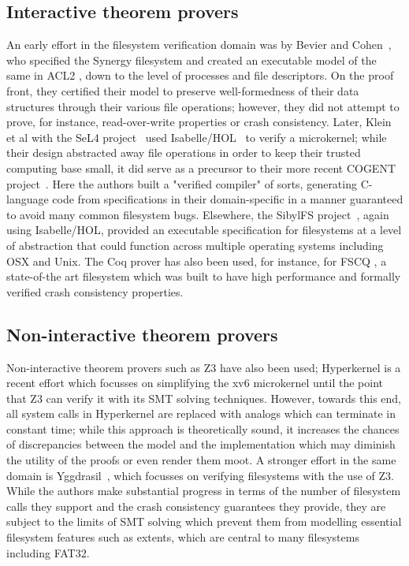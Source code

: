 \documentclass[runningheads,a4paper]{llncs}
\begin{document}
\subsection{Interactive theorem provers}
An early effort in the filesystem verification domain was by Bevier
and Cohen~\cite{bevier1996executable}, who specified the Synergy
filesystem and created an executable model of the same in ACL2
\cite{kaufmann_manolios_moore_2000}, down to the level of processes
and file descriptors. On the proof front, they certified their model
to preserve well-formedness of their data structures through their
various file operations; however, they did not attempt to prove, for
instance, read-over-write properties or crash consistency. Later,
Klein et al with the SeL4 project~\cite{klein2009sel4} used
Isabelle/HOL~\cite{nipkow2002isabelle} to verify a microkernel;
while their design abstracted away file operations in order to keep
their trusted computing base small, it did serve as a precursor to their
more recent COGENT project~\cite{amani2016cogent}. Here the authors
built a "verified compiler" of sorts, generating C-language code from
specifications in their domain-specific in a manner guaranteed to
avoid many common filesystem bugs. Elsewhere, the SibylFS
project~\cite{ridge2015sibylfs}, again using Isabelle/HOL, provided
an executable specification for filesystems at a level of abstraction
that could function across multiple operating systems including OSX
and Unix. The Coq prover \cite{bertot2013interactive} has also been
used, for instance, for FSCQ
\cite{DBLP:conf/usenix/ChenZCCKZ16}, a state-of-the art filesystem
which was built to have high performance and formally verified crash
consistency properties.

\subsection{Non-interactive theorem provers}
Non-interactive theorem provers such as Z3 \cite{de2008z3}
have also been used; Hyperkernel
\cite{Nelson:2017:HPV:3132747.3132748} is a recent effort which
focusses on simplifying the xv6 microkernel until the point that Z3
can verify it with its SMT solving techniques. However, towards this
end, all system calls in Hyperkernel are replaced with analogs which
can terminate in constant time; while this approach is theoretically
sound, it increases the chances of discrepancies between the model and
the implementation which may diminish the utility of the proofs or
even render them moot. A stronger effort in the same domain is
Yggdrasil~\cite{sigurbjarnarson2016push}, which focusses on verifying
filesystems with the use of Z3. While the authors make substantial
progress in terms of the number of filesystem calls they support and
the crash consistency guarantees they provide, they are subject to
the limits of SMT solving which prevent them from modelling essential
filesystem features such as extents, which are central to many
filesystems including FAT32.
\end{document}
